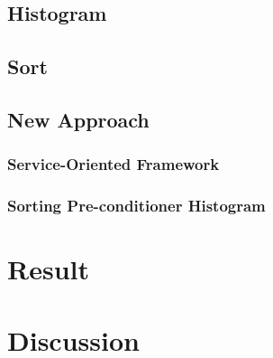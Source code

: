 \documentclass[times, 10pt,onecolumn]{article} %
\begin{document}
\subsection{Histogram}
\subsection{Sort\cite{ps}}
\subsection{New Approach}
\subsubsection{Service-Oriented Framework}
\subsubsection{Sorting Pre-conditioner Histogram}
\section{Result}
\section{Discussion}


\end{document}
